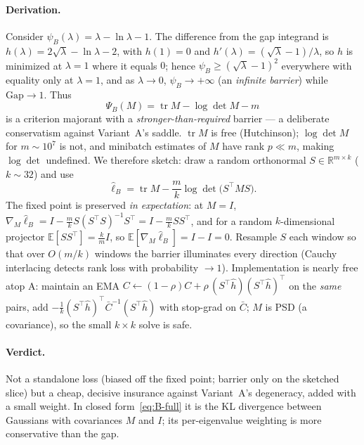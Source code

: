 \documentclass[11pt]{article}
\theoremstyle{plain}
\theoremstyle{definition}
\theoremstyle{remark}
\DeclareMathOperator{\tr}{tr}
\newcommand{\R}{\mathbb{R}}
\newcommand{\E}{\mathbb{E}}
\newcommand{\hh}{\hat{h}}
\begin{document}
\paragraph{Derivation.} Consider $\psi_B(\lambda)=\lambda-\ln\lambda-1$. The difference from
the gap integrand is $h(\lambda)=2\sqrt\lambda-\ln\lambda-2$, with $h(1)=0$ and
$h'(\lambda)=(\sqrt\lambda-1)/\lambda$, so $h$ is minimized at $\lambda=1$ where it equals
$0$; hence $\psi_B\ge(\sqrt\lambda-1)^2$ everywhere with equality only at $\lambda=1$, and as
$\lambda\to0$, $\psi_B\to+\infty$ (an \emph{infinite barrier}) while $\mathrm{Gap}\to1$.
Thus
\begin{equation}
\label{eq:B-full}
  \Psi_B(M)=\tr M-\log\det M-m
\end{equation}
is a criterion majorant with a \emph{stronger-than-required} barrier --- a deliberate
conservatism against Variant~A's saddle. $\tr M$ is free (Hutchinson); $\log\det M$ for
$m\sim10^7$ is not, and minibatch estimates of $M$ have rank $p\ll m$, making $\log\det$
undefined. We therefore sketch: draw a random orthonormal $S\in\R^{m\times k}$ ($k\sim32$)
and use
\begin{equation}
\label{eq:B-sketch}
  \hat\ell_B=\tr M-\frac{m}{k}\log\det\!\big(S^{\!\top}MS\big).
\end{equation}
The fixed point is preserved \emph{in expectation}: at $M=I$,
$\nabla_M\hat\ell_B=I-\frac{m}{k}S(S^{\!\top}S)^{-1}S^{\!\top}=I-\frac{m}{k}SS^{\!\top}$, and
for a random $k$-dimensional projector $\E[SS^{\!\top}]=\frac{k}{m}I$, so
$\E[\nabla_M\hat\ell_B]=I-I=0$. Resample $S$ each window so that over $O(m/k)$ windows the
barrier illuminates every direction (Cauchy interlacing detects rank loss with probability
$\to1$). Implementation is nearly free atop A: maintain an EMA
$C\leftarrow(1-\rho)C+\rho\,(S^{\!\top}\hh)(S^{\!\top}\hh)^{\!\top}$ on the \emph{same} pairs,
add $-\frac1k(S^{\!\top}\hh)^{\!\top}\bar C^{-1}(S^{\!\top}\hh)$ with stop-grad on $\bar C$;
$M$ is PSD (a covariance), so the small $k\times k$ solve is safe.

\paragraph{Verdict.} Not a standalone loss (biased off the fixed point; barrier only on the
sketched slice) but a cheap, decisive insurance against Variant~A's degeneracy, added with
a small weight. In closed form~\eqref{eq:B-full} it is the KL divergence between Gaussians
with covariances $M$ and $I$; its per-eigenvalue weighting is more conservative than the
gap.
\end{document}

